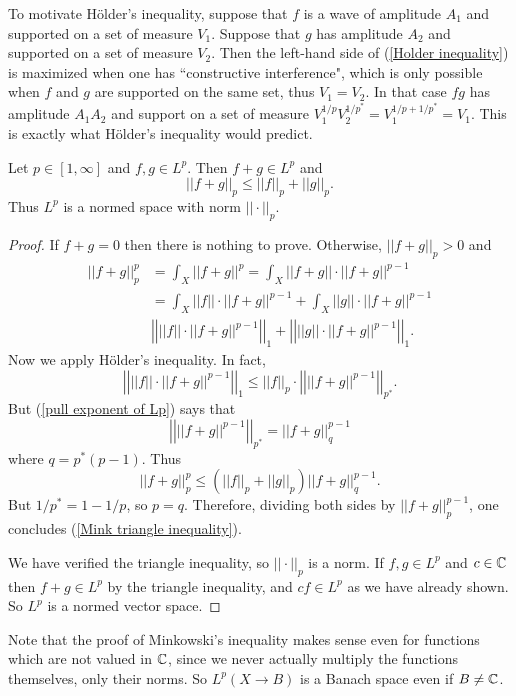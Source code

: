 To motivate H\"older's inequality, suppose that $f$ is a wave of amplitude $A_1$ and supported on a set of measure $V_1$.
Suppose that $g$ has amplitude $A_2$ and supported on a set of measure $V_2$.
Then the left-hand side of (\ref{Holder inequality}) is maximized when one has ``constructive interference", which is only possible when $f$ and $g$ are supported on the same set, thus $V_1 = V_2$.
In that case $fg$ has amplitude $A_1A_2$ and support on a set of measure $V_1^{1/p}V_2^{1/p^*} = V_1^{1/p+1/p^*} = V_1$.
This is exactly what H\"older's inequality would predict.

\begin{theorem}
Let $p \in [1, \infty]$ and $f, g \in L^p$. Then $f + g \in L^p$ and
\begin{equation}
\label{Mink triangle inequality}
||f + g||_p \leq ||f||_p + ||g||_p.
\end{equation}
Thus $L^p$ is a normed space with norm $||\cdot||_p$.
\end{theorem}
\begin{proof}
If $f + g = 0$ then there is nothing to prove.
Otherwise, $||f + g||_p > 0$ and
\begin{align*}
||f + g||_p^p &= \int_X ||f + g||^p = \int_X ||f + g||\cdot ||f + g||^{p-1} \\
&= \int_X ||f||\cdot ||f + g||^{p-1} + \int_X ||g||\cdot ||f + g||^{p-1}\\
&\left|\left|||f||\cdot ||f + g||^{p-1}\right|\right|_1 + \left|\left|||g||\cdot ||f + g||^{p-1}\right|\right|_1.
\end{align*}
Now we apply H\"older's inequality. In fact,
\[\left|\left|||f||\cdot ||f + g||^{p-1}\right|\right|_1 \leq ||f||_p \cdot \left|\left|||f + g||^{p-1}\right|\right|_{p^*}.\]
But (\ref{pull exponent of Lp}) says that
\[\left|\left|||f + g||^{p-1}\right|\right|_{p^*} = ||f + g||_q^{p - 1}\]
where $q = p^*(p-1)$. Thus
\[||f + g||_p^p \leq (||f||_p + ||g||_p) ||f + g||_q^{p - 1}.\]
But $1/p^* = 1 - 1/p$, so $p = q$. Therefore, dividing both sides by $||f + g||_p^{p - 1}$, one concludes (\ref{Mink triangle inequality}).

We have verified the triangle inequality, so $||\cdot||_p$ is a norm. If $f, g \in L^p$ and $c \in \mathbb{C}$ then $f + g \in L^p$ by the triangle inequality, and $cf \in L^p$ as we have already shown.
So $L^p$ is a normed vector space.
\end{proof}
Note that the proof of Minkowski's inequality makes sense even for functions which are not valued in $\mathbb{C}$, since we never actually multiply the functions themselves, only their norms. So $L^p(X \to B)$ is a Banach space even if $B \neq \mathbb{C}$.

